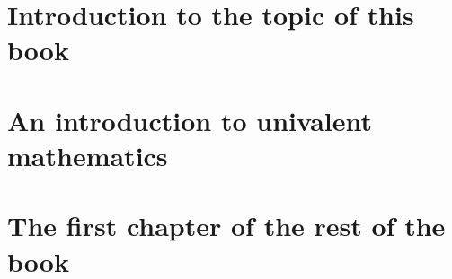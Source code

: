 \documentclass[letter,12pt]{amsbook}
\begin{document}

\chapter{Introduction to the topic of this book}

\chapter{An introduction to univalent mathematics}

\chapter{The first chapter of the rest of the book}


\end{document}
